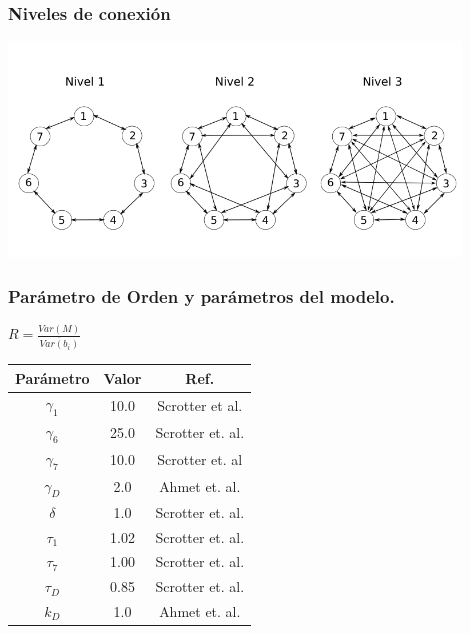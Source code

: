 \documentclass[xcolor=table, xllnames]{beamer}
\begin{document}
\begin{frame}
	\frametitle{Niveles de conexi\'on}
	\includegraphics[width = 12cm]{Figuras/niveles.png}
\end{frame}


\begin{frame}
	\frametitle{Parámetro de Orden y par\'ametros del modelo.}
	\centering $R=\frac{Var(M)}{\overline{Var(b_i)}}$
	\pause
	\begin{table}
		\begin{tabular}{|c | c| c|}
			\hline Par\'ametro &Valor & Ref. \\ \hline
			$\gamma_1$ & 10.0 & Scrotter et al. \\ \hline 
			$\gamma_6$ & 25.0 & Scrotter et. al.\\ \hline
			$\gamma_7$ & 10.0 & Scrotter et. al\\ \hline
			$\gamma_D$ & 2.0 & Ahmet et. al. \\ \hline
			$\delta$   & 1.0 & Scrotter et. al. \\ \hline
			$\tau_1 $ & 1.02 & Scrotter et. al.\\ \hline
			$\tau_7 $ & 1.00 & Scrotter et. al.\\ \hline
			$\tau_D $ & 0.85 &Scrotter et. al. \\ \hline
			$k_D $ & 1.0 & Ahmet et. al.\\ \hline
		\end{tabular}
	\end{table}
\end{frame}

\end{document}
